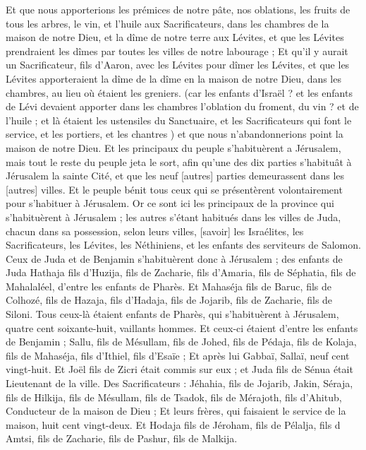 \begin{multicols}{2}
{Et que nous apporterions les prémices de notre pâte, nos oblations, les fruits de tous les arbres, le vin, et l'huile aux Sacrificateurs, dans les chambres de la maison de notre Dieu, et la dîme de notre terre aux Lévites, et que les Lévites prendraient les dîmes par toutes les villes de notre labourage ;
Et qu'il y aurait un Sacrificateur, fils d'Aaron, avec les Lévites pour dîmer les Lévites, et que les Lévites apporteraient la dîme de la dîme en la maison de notre Dieu, dans les chambres, au lieu où étaient les greniers.
(car les enfants d'Israël ? et les enfants de Lévi devaient apporter dans les chambres l'oblation du froment, du vin ? et de l'huile ; et là étaient les ustensiles du Sanctuaire, et les Sacrificateurs qui font le service, et les portiers, et les chantres ) et que nous n'abandonnerions point la maison de notre Dieu.
\VerseOne{}Et les principaux du peuple s'habituèrent a Jérusalem, mais tout le reste du peuple jeta le sort, afin qu'une des dix parties s'habituât à Jérusalem la sainte Cité, et que les neuf [autres] parties demeurassent dans les [autres] villes.
Et le peuple bénit tous ceux qui se présentèrent volontairement pour s'habituer à Jérusalem.
Or ce sont ici les principaux de la province qui s'habituèrent à Jérusalem ; les autres s'étant habitués dans les villes de Juda, chacun dans sa possession, selon leurs villes, [savoir] les Israélites, les Sacrificateurs, les Lévites, les Néthiniens, et les enfants des serviteurs de Salomon.
Ceux de Juda et de Benjamin s'habituèrent donc à Jérusalem ; des enfants de Juda Hathaja fils d'Huzija, fils de Zacharie, fils d'Amaria, fils de Séphatia, fils de Mahalaléel, d'entre les enfants de Pharès.
Et Mahaséja fils de Baruc, fils de Colhozé, fils de Hazaja, fils d'Hadaja, fils de Jojarib, fils de Zacharie, fils de Siloni.
Tous ceux-là étaient enfants de Pharès, qui s'habituèrent à Jérusalem, quatre cent soixante-huit, vaillants hommes.
Et ceux-ci étaient d'entre les enfants de Benjamin ; Sallu, fils de Mésullam, fils de Johed, fils de Pédaja, fils de Kolaja, fils de Mahaséja, fils d'Ithiel, fils d'Esaïe ;
Et après lui Gabbaï, Sallaï, neuf cent vingt-huit.
Et Joël fils de Zicri était commis sur eux ; et Juda fils de Sénua était Lieutenant de la ville.
Des Sacrificateurs : Jéhahia, fils de Jojarib, Jakin,
Séraja, fils de Hilkija, fils de Mésullam, fils de Tsadok, fils de Mérajoth, fils d'Ahitub, Conducteur de la maison de Dieu ;
Et leurs frères, qui faisaient le service de la maison, huit cent vingt-deux. Et Hodaja fils de Jéroham, fils de Pélalja, fils d Amtsi, fils de Zacharie, fils de Pashur, fils de Malkija.
}
\end{multicols}
